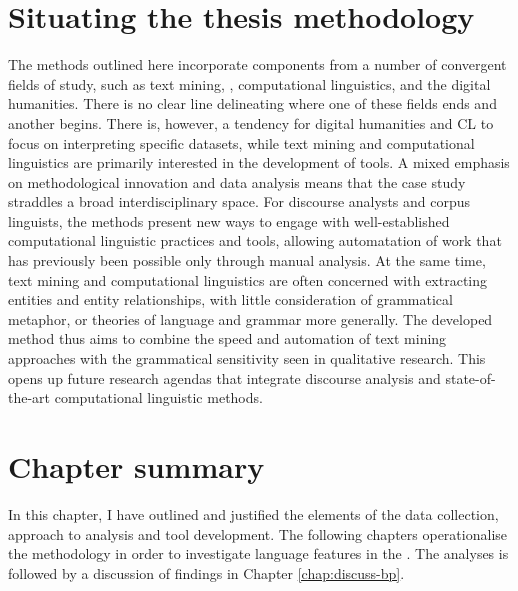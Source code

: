 \section{Situating the thesis methodology}

The methods outlined here incorporate components from a number of convergent fields of study, such as text mining, , computational linguistics, and the digital humanities. There is no clear line delineating where one of these fields ends and another begins. There is, however, a tendency for digital humanities and \gls{CL} to focus on interpreting specific datasets, while text mining and computational linguistics are primarily interested in the development of tools. A mixed emphasis on methodological innovation and data analysis means that the case study straddles a broad interdisciplinary space. For discourse analysts and corpus linguists, the methods present new ways to engage with well\hyp{}established computational linguistic practices and tools, allowing automatation of work that has previously been possible only through manual analysis. At the same time, text mining and computational linguistics are often concerned with extracting entities and entity relationships, with little consideration of grammatical metaphor, or theories of language and grammar more generally. The developed method thus aims to combine the speed and automation of text mining approaches with the grammatical sensitivity seen in qualitative research. This opens up future research agendas that integrate discourse analysis and state\hyp{}of\hyp{}the\hyp{}art computational linguistic methods.

\section{Chapter summary}

In this chapter, I have outlined and justified the elements of the data collection, approach to analysis and tool development. The following chapters operationalise the methodology in order to investigate language features in the . The analyses is followed by a discussion of findings in Chapter \ref{chap:discuss-bp}.





